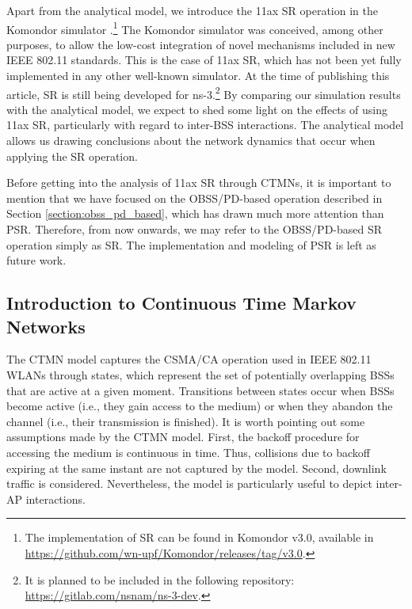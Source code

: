 \documentclass{ieeeaccess}
\begin{document}
Apart from the analytical model, we introduce the 11ax SR operation in the Komondor simulator \cite{barrachina2019komondor}.\footnote{The implementation of SR can be found in Komondor v3.0, available in \url{https://github.com/wn-upf/Komondor/releases/tag/v3.0}.} The Komondor simulator was conceived, among other purposes, to allow the low-cost integration of novel mechanisms included in new IEEE 802.11 standards. This is the case of 11ax SR, which has not been yet fully implemented in any other well-known simulator. At the time of publishing this article, SR is still being developed for ns-3.\footnote{It is planned to be included in the following repository: \url{https://gitlab.com/nsnam/ns-3-dev}.} By comparing our simulation results with the analytical model, we expect to shed some light on the effects of using 11ax SR, particularly with regard to inter-BSS interactions. The analytical model allows us drawing conclusions about the network dynamics that occur when applying the SR operation.

Before getting into the analysis of 11ax SR through CTMNs, it is important to mention that we have focused on the OBSS/PD-based operation described in Section \ref{section:obss_pd_based}, which has drawn much more attention than PSR. Therefore, from now onwards, we may refer to the OBSS/PD-based SR operation simply as SR. The implementation and modeling of PSR is left as future work.%

\subsection{Introduction to Continuous Time Markov Networks}
The CTMN model captures the CSMA/CA operation used in IEEE 802.11 WLANs through states, which represent the set of potentially overlapping BSSs that are active at a given moment. Transitions between states occur when BSSs become active (i.e., they gain access to the medium) or when they abandon the channel (i.e., their transmission is finished). It is worth pointing out some assumptions made by the CTMN model. First, the backoff procedure for accessing the medium is continuous in time. Thus, collisions due to backoff expiring at the same instant are not captured by the model. Second, downlink traffic is considered. Nevertheless, the model is particularly useful to depict inter-AP interactions.
\end{document}
